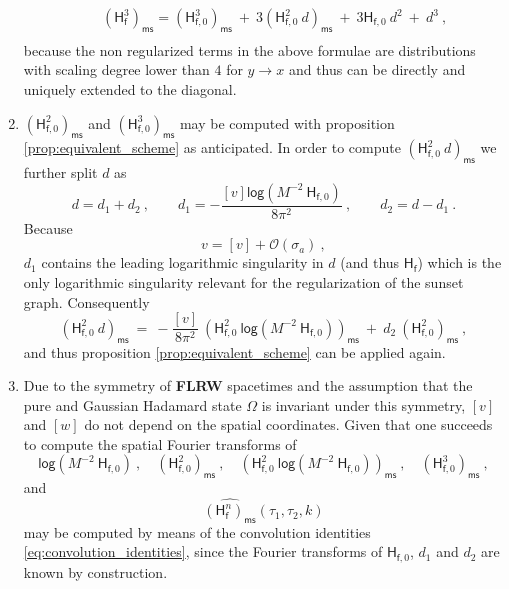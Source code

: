 \documentclass[11pt]{book}
\newcommand{\ms}{\mathsf{ms}}
\renewcommand{\log}{\mathsf{log}}
\newcommand{\Ocal}{\mathcal{O}}
\newcommand{\Hsf}{\mathsf{H}}
\newcommand{\fsf}{\mathsf{f}}
\theoremstyle{break}
\begin{document}
\begin{enumerate}
\begin{eqnarray}
&& (\Hsf_\fsf^3)_\ms = (\Hsf_{\fsf,0}^3)_\ms \ + \ 3 \left(\Hsf_{\fsf,0}^2 \ d \right)_\ms \ + \ 3 \Hsf_{\fsf,0} \ d^2 \ + \ d^3 \ , \nonumber \\
\label{eq:fish_sunset_reg}
\end{eqnarray}
%
because the non regularized terms in the above formulae are distributions with scaling degree lower than $4$ for $y \to x$ and thus can be directly and uniquely extended to the diagonal.
%
%
\item $\left(\Hsf_{\fsf,0}^2\right)_\ms$ and  $\left(\Hsf_{\fsf,0}^3\right)_\ms$ may be computed with proposition \ref{prop:equivalent_scheme} as anticipated. In order to compute $\left(\Hsf_{\fsf,0}^2 \ d\right)_\ms$ we further split $d$ as
%
\begin{equation*}%
d = d_1 + d_2 \ , \qquad d_1 = - \frac{[v] \log\left(M^{-2} \ \Hsf_{\fsf,0}\right)}{8\pi^2} \ ,\qquad d_2 = d - d_1 \ .
\label{eq:d_split}
\end{equation*}
%
Because 
%
\begin{equation*}
v = [v] + \Ocal(\sigma_a) \ , 
\end{equation*}
%
$d_1$ contains the leading logarithmic singularity in $d$ (and thus $\Hsf_\fsf$) which is the only logarithmic singularity relevant for the regularization of the sunset graph. Consequently
%
\begin{equation}
\left(\Hsf_{\fsf,0}^2 \ d\right)_\ms \ = \ - \frac{[v]}{8\pi^2} \ \left(\Hsf_{\fsf,0}^2 \ \log\left(M^{-2} \ \Hsf_{\fsf,0} \right) \right)_\ms \ + \ d_2 \ \left(\Hsf_{\fsf,0}^2 \right)_\ms \ ,
\label{eq:fish_sunset_reg_2}
\end{equation}
%
and thus proposition \ref{prop:equivalent_scheme} can be applied again.
%
%
\item Due to the symmetry of \textbf{FLRW} spacetimes and the assumption that the pure and Gaussian Hadamard state $\Omega$ is invariant under this symmetry, $[v]$ and $[w]$ do not depend on the spatial coordinates. Given that one succeeds to compute the spatial Fourier transforms of 
%
\begin{equation*}
\log \left(M^{-2} \ \Hsf_{\fsf,0}\right) \ , \quad
\left(\Hsf_{\fsf,0}^2\right)_\ms \ , \quad
\left(\Hsf_{\fsf,0}^2 \ \log\left(M^{-2} \ \Hsf_{\fsf,0}\right)\right)_\ms \ , \quad  \left(\Hsf_{\fsf,0}^3\right)_\ms \ , 
\end{equation*}
%
and
%
\begin{equation*}
\widehat{(\Hsf_\fsf^n)_\ms}(\tau_1,\tau_2,k)
\end{equation*}
%
may be computed by means of the convolution identities \eqref{eq:convolution_identities}, since the Fourier transforms of $\Hsf_{\fsf,0}$, $d_1$ and $d_2$ are known by construction.
%
%
\end{enumerate}
\end{document}
